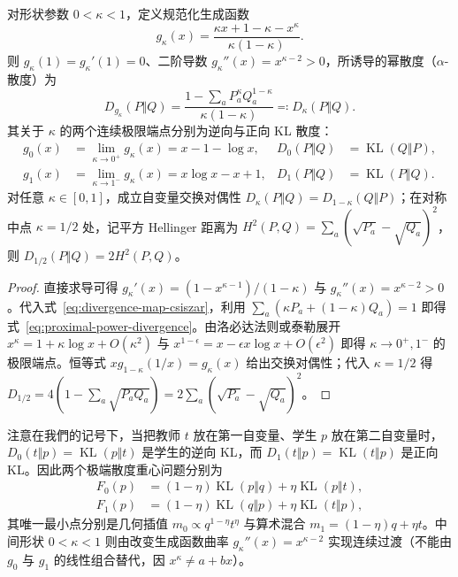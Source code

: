 \documentclass[lang=cn,scheme=chinese,openany]{elegantbook}
\newcommand{\KL}{\operatorname{KL}}
\begin{document}
\begin{theorem}
\label{thm:divergence-map-power}
对形状参数 $0<\kappa<1$，定义规范化生成函数
\begin{equation}
 g_\kappa(x)=\frac{\kappa x+1-\kappa-x^\kappa}{\kappa(1-\kappa)}.
 \label{eq:divergence-map-power-generator}
\end{equation}
则 $g_\kappa(1)=g_\kappa'(1)=0$、二阶导数 $g_\kappa''(x)=x^{\kappa-2}>0$，所诱导的幂散度（$\alpha$-散度）为
\begin{equation}
 D_{g_\kappa}(P\Vert Q)
 =\frac{1-\sum_a P_a^\kappa Q_a^{1-\kappa}}{\kappa(1-\kappa)}
 \eqqcolon D_\kappa(P\Vert Q).
 \label{eq:proximal-power-divergence}
\end{equation}
其关于 $\kappa$ 的两个连续极限端点分别为逆向与正向 KL 散度：
\begin{align}
 g_0(x)&=\lim_{\kappa\to 0^+}g_\kappa(x)=x-1-\log x,&D_0(P\Vert Q)&=\KL(Q\Vert P),\\
 g_1(x)&=\lim_{\kappa\to 1^-}g_\kappa(x)=x\log x-x+1,&D_1(P\Vert Q)&=\KL(P\Vert Q).
 \label{eq:divergence-map-kl-endpoints}
\end{align}
对任意 $\kappa\in[0,1]$，成立自变量交换对偶性 $D_\kappa(P\Vert Q)=D_{1-\kappa}(Q\Vert P)$；在对称中点 $\kappa=1/2$ 处，记平方 Hellinger 距离为 $H^2(P,Q)=\sum_a(\sqrt{P_a}-\sqrt{Q_a})^2$，则 $D_{1/2}(P\Vert Q)=2H^2(P,Q)$。
\end{theorem}
\begin{proof}
直接求导可得 $g_\kappa'(x)=(1-x^{\kappa-1})/(1-\kappa)$ 与 $g_\kappa''(x)=x^{\kappa-2}>0$。代入式~\eqref{eq:divergence-map-csiszar}，利用 $\sum_a(\kappa P_a+(1-\kappa)Q_a)=1$ 即得式~\eqref{eq:proximal-power-divergence}。由洛必达法则或泰勒展开 $x^\kappa=1+\kappa\log x+O(\kappa^2)$ 与 $x^{1-\epsilon}=x-\epsilon x\log x+O(\epsilon^2)$ 即得 $\kappa\to 0^+,1^-$ 的极限端点。恒等式 $x g_{1-\kappa}(1/x)=g_\kappa(x)$ 给出交换对偶性；代入 $\kappa=1/2$ 得 $D_{1/2}=4(1-\sum_a\sqrt{P_a Q_a})=2\sum_a(\sqrt{P_a}-\sqrt{Q_a})^2$。
\end{proof}

注意在我們的记号下，当把教师 $t$ 放在第一自变量、学生 $p$ 放在第二自变量时，$D_0(t\Vert p)=\KL(p\Vert t)$ 是学生的逆向 KL，而 $D_1(t\Vert p)=\KL(t\Vert p)$ 是正向 KL。因此两个极端散度重心问题分别为
\begin{align}
 F_0(p)&=(1-\eta)\KL(p\Vert q)+\eta\KL(p\Vert t),\\
 F_1(p)&=(1-\eta)\KL(q\Vert p)+\eta\KL(t\Vert p),
 \label{eq:divergence-map-barycenter-endpoints}
\end{align}
其唯一最小点分别是几何插值 $m_0\propto q^{1-\eta}t^\eta$ 与算术混合 $m_1=(1-\eta)q+\eta t$。中间形状 $0<\kappa<1$ 则由改变生成函数曲率 $g_\kappa''(x)=x^{\kappa-2}$ 实现连续过渡（不能由 $g_0$ 与 $g_1$ 的线性组合替代，因 $x^\kappa\ne a+bx$）。
\end{document}
